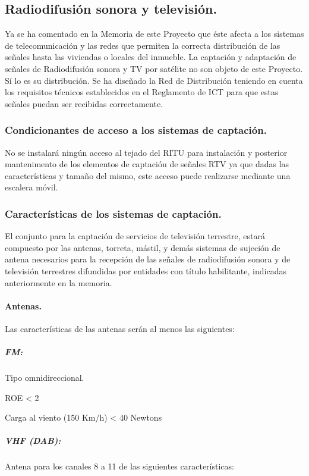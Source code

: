 \subsection{Radiodifusión sonora y televisión.}

Ya se ha comentado en la Memoria de este Proyecto que éste afecta a los sistemas de telecomunicación y las redes que permiten la correcta distribución de las señales hasta las viviendas o locales del inmueble.
La captación y adaptación de señales de Radiodifusión sonora y TV por satélite no son objeto de este Proyecto. Sí lo es su distribución.
Se ha diseñado la Red de Distribución teniendo en cuenta los requisitos técnicos establecidos en el Reglamento de ICT para que estas señales puedan ser recibidas correctamente.

\subsubsection{Condicionantes de acceso a los sistemas de captación.}

No se instalará ningún acceso al tejado del RITU para instalación y posterior mantenimento de los elementos de captación de señales RTV ya que dadas las características y tamaño del mismo, este acceso puede realizarse mediante una escalera móvil.

\subsubsection{Características de los sistemas de captación.}

El conjunto para la captación de servicios de televisión terrestre, estará compuesto por las antenas, torreta, mástil, y demás sistemas de sujeción de antena necesarios para la recepción de las señales de radiodifusión sonora y de televisión terrestres difundidas por entidades con título habilitante, indicadas anteriormente en la memoria.

\paragraph{Antenas.}

Las características de las antenas serán al menos las siguientes:

\subparagraph*{FM: }
Tipo omnidireccional.

ROE < 2 

Carga al viento (150 Km/h) < 40 Newtons

\subparagraph*{VHF (DAB): }
Antena para los canales 8 a 11 de las siguientes características:

